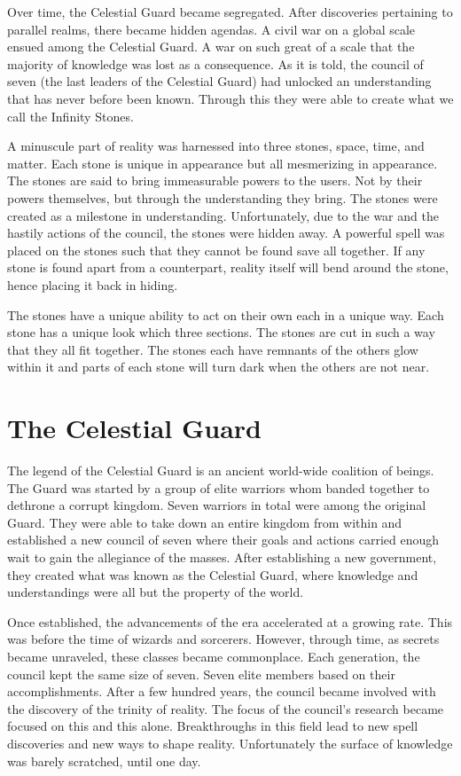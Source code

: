 Over time, the Celestial Guard became segregated. After discoveries pertaining to parallel realms, there became hidden agendas. A civil war on a global scale ensued among the Celestial Guard. A war on such great of a scale that the majority of knowledge was lost as a consequence. As it is told, the council of seven (the last leaders of the Celestial Guard) had unlocked an understanding that has never before been known. Through this they were able to create what we call the Infinity Stones. 

A minuscule part of reality was harnessed into three stones, space, time, and matter. Each stone is unique in appearance but all mesmerizing in appearance. The stones are said to bring immeasurable powers to the users. Not by their powers themselves, but through the understanding they bring. The stones were created as a milestone in understanding. Unfortunately, due to the war and the hastily actions of the council, the stones were hidden away. A powerful spell was placed on the stones such that they cannot be found save all together. If any stone is found apart from a counterpart, reality itself will bend around the stone, hence placing it back in hiding. 

The stones have a unique ability to act on their own each in a unique way. Each stone has a unique look which three sections. The stones are cut in such a way that they all fit together. The stones each have remnants of the others glow within it and parts of each stone will turn dark when the others are not near. 

\section{The Celestial Guard}

The legend of the Celestial Guard is an ancient world-wide coalition of beings. The Guard was started by a group of elite warriors whom banded together to dethrone a corrupt kingdom. Seven warriors in total were among the original Guard. They were able to take down an entire kingdom from within and established a new council of seven where their goals and actions carried enough wait to gain the allegiance of the masses. After establishing a new government, they created what was known as the Celestial Guard, where knowledge and understandings were all but the property of the world. 

Once established, the advancements of the era accelerated at a growing rate. This was before the time of wizards and sorcerers. However, through time, as secrets became unraveled, these classes became commonplace. Each generation, the council kept the same size of seven. Seven elite members based on their accomplishments. After a few hundred years, the council became involved with the discovery of the trinity of reality. The focus of the council's research became focused on this and this alone. Breakthroughs in this field lead to new spell discoveries and new ways to shape reality. Unfortunately the surface of knowledge was barely scratched, until one day.

